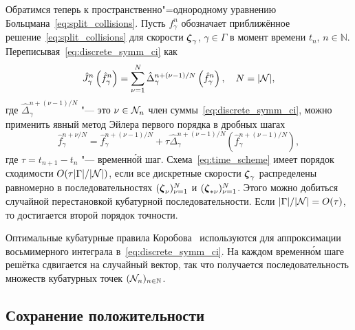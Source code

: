 Обратимся теперь к пространственно"=однородному уравнению Больцмана~\eqref{eq:split_collisions}.
Пусть \(f_\gamma^n\) обозначает приближённое решение~\eqref{eq:split_collisions}
для скорости \({\boldsymbol{\zeta}}_\gamma\), \(\gamma\in\Gamma\) в момент времени \(t_n\), \(n\in\mathbb{N}\).
Переписывая~\eqref{eq:discrete_symm_ci} как
\begin{equation}\label{eq:discrete_short_ci}
    \hat{J}_\gamma^n\left(\hat{f}_\gamma^n\right) =
        \sum_{\nu=1}^N \hat{\Delta}_\gamma^{n+(\nu-1)/N} \left(\hat{f}_\gamma^n\right), \quad
    N=|\mathcal{N}|,
\end{equation}
где \(\hat{\Delta}_\gamma^{n+(\nu-1)/N}\) "--- это \(\nu\in\mathcal{N}_n\) член суммы~\eqref{eq:discrete_symm_ci},
можно применить явный метод Эйлера первого порядка в дробных шагах
\begin{equation}\label{eq:time_scheme}
    \hat{f}_\gamma^{n+\nu/N} = \hat{f}_\gamma^{n+(\nu-1)/N} + \tau \hat{\Delta}_\gamma^{n+(\nu-1)/N}
    \left(\hat{f}_\gamma^{n+(\nu-1)/N}\right),
\end{equation}
где \(\tau = t_{n+1} - t_n\) "--- временн\'{о}й шаг.
Схема~\eqref{eq:time_scheme} имеет порядок сходимости \(O(\tau|\Gamma|/|\mathcal{N}|)\),
если все дискретные скорости \({\boldsymbol{\zeta}}_\gamma\) распределены равномерно
в последовательностях \(({\boldsymbol{\zeta}}_{\nu})_{\nu=1}^N\) и \(({\boldsymbol{\zeta}}_{*\nu})_{\nu=1}^N\).
Этого можно добиться случайной перестановкой кубатурной последовательности.
Если \(|\Gamma|/|\mathcal{N}| = O(\tau)\), то достигается второй порядок точности.

Оптимальные кубатурные правила Коробова~\cite{Korobov1959, Sloan1994} используются
для аппроксимации восьмимерного интеграла в~\eqref{eq:discrete_symm_ci}.
На каждом временн\'{о}м шаге решётка сдвигается на случайный вектор,
так что получается последовательность множеств кубатурных точек \((\mathcal{N}_n)_{n\in\mathbb{N}}\).

\subsection{Сохранение положительности}

